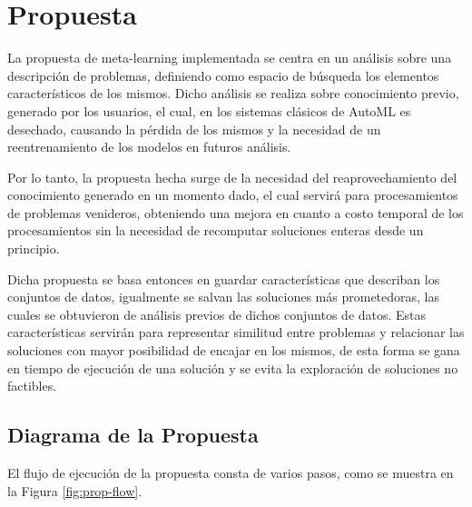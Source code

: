 \chapter{Propuesta}\label{chapter:proposal}


La propuesta de meta-learning implementada se centra en un análisis sobre
una descripción de problemas, definiendo como espacio de búsqueda los elementos
característicos de los mismos. Dicho análisis se realiza sobre conocimiento
previo, generado por los usuarios, el cual, en los sistemas clásicos de AutoML
es desechado, causando la pérdida de los mismos y la necesidad de un
reentrenamiento de los modelos en futuros análisis.

Por lo tanto, la propuesta hecha surge de la necesidad del reaprovechamiento
del conocimiento generado en un momento dado, el cual servirá para
procesamientos de problemas venideros, obteniendo una mejora en cuanto a costo
temporal de los procesamientos sin la necesidad de recomputar soluciones
enteras desde un principio.


Dicha propuesta se basa entonces en guardar características que describan los
conjuntos de datos, igualmente se salvan las soluciones más prometedoras, las
cuales se obtuvieron de análisis previos de dichos conjuntos de datos. Estas
características servirán para representar similitud entre problemas y
relacionar las soluciones con mayor posibilidad de encajar en los mismos, de
esta forma se gana en tiempo de ejecución de una solución y se evita la
exploración de soluciones no factibles.


\section{Diagrama de la Propuesta}


El flujo de ejecución de la propuesta consta de varios pasos, como se muestra
en la Figura \ref{fig:prop-flow}.

